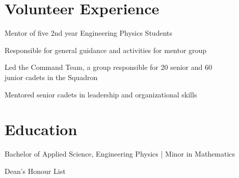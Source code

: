 \documentclass[]{deedy-resume-openfont}
\begin{document}

\section{Volunteer Experience}
\begin{tightemize}
	\item Mentor of five 2nd year Engineering Physics Students
	\item Responsible for general guidance and activities for mentor group
\end{tightemize}
\sectionsep

\begin{tightemize}
	\item Led the Command Team, a group responsible for 20 senior and 60 \\  junior cadets in the Squadron
	\item Mentored senior cadets in leadership and organizational skills
\end{tightemize}
\sectionsep

\section{Education}
\begin{tightemize}
	\item Bachelor of Applied Science, Engineering Physics | Minor in Mathematics \\
	\item Dean's Honour List
\end{tightemize}
\sectionsep
\end{document}
